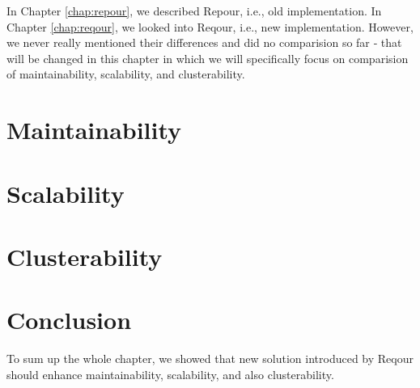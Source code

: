 \documentclass[../main.tex]{subfiles}
\begin{document}
In Chapter \ref{chap:repour}, we described Repour, i.e., old implementation. In Chapter \ref{chap:reqour}, we looked into Reqour, i.e., new implementation. However, we never really mentioned their differences and did no comparision so far ‐ that will be changed in this chapter in which we will specifically focus on comparision of maintainability, scalability, and clusterability.

\section{Maintainability}


\section{Scalability}


\section{Clusterability}


\section*{Conclusion}
To sum up the whole chapter, we showed that new solution introduced by Reqour should enhance maintainability, scalability, and also clusterability.
\end{document}
